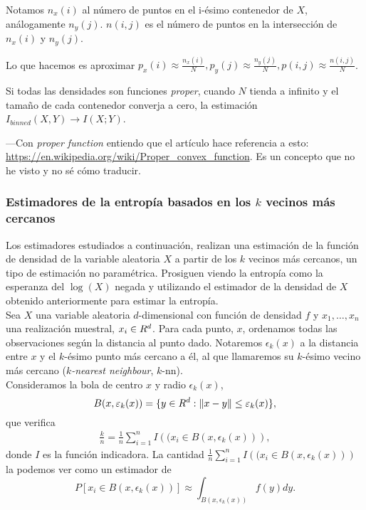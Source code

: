 \documentclass[10pt,a4paper]{article} %
\let\mathbb\relax
\theoremstyle{definition}
\begin{document}
Notamos $n_x(i)$ al número de puntos en el i-ésimo contenedor de $X$, análogamente $n_y(j)$. $n(i,j)$ es el número de puntos en la intersección de $n_x(i)$ y $n_y(j)$.

Lo que hacemos es aproximar $p_x(i) \approx \frac{n_x(i)}{N}, p_y(j) \approx \frac{n_y(j)}{N}, p(i,j) \approx \frac{n(i,j)}{N}$.

Si todas las densidades son funciones \textit{proper}, cuando $N$ tienda a infinito y el tamaño de cada contenedor converja a cero, la estimación $I_{\textit{binned}}(X,Y) \to I(X;Y)$.

---Con \textit{proper function} entiendo que el artículo hace referencia a esto: \url{https://en.wikipedia.org/wiki/Proper\_convex\_function}. Es un concepto que no he visto y no sé cómo traducir.

\subsubsection{Estimadores de la entropía basados en los $k$ vecinos más cercanos}

Los estimadores estudiados a continuación, realizan una estimación de la función de densidad de la variable aleatoria $X$ a partir de los $k$ vecinos más cercanos, un tipo de estimación no paramétrica. Prosiguen viendo la entropía como la esperanza del $\log(X)$ negada y utilizando el estimador de la densidad de $X$ obtenido anteriormente para estimar la entropía.\\

Sea $X$ una variable aleatoria $d$-dimensional con función de densidad $f$ y $x_1,\dots,x_n$ una realización muestral, $x_i\in \mathbb{R}^d$. Para cada punto, $x$, ordenamos todas las observaciones según la distancia al punto dado. Notaremos $\epsilon_k(x)$ a la distancia entre $x$ y el $k$-ésimo punto más cercano a él, al que llamaremos su $k$-ésimo vecino más cercano (\textit{$k$-nearest neighbour}, $k$-nn).\\

Consideramos la bola de centro $x$ y radio $\epsilon_k(x)$,\[
B(x, \epsilon_k(x)) = \{y \in \R^d: \Vert x - y\Vert \leq \epsilon_k(x)\},
\]que verifica \begin{align}\label{eq:knn-ind}
\frac{k}{n} = \frac{1}{n} \sum_{i=1}^nI\left((x_i\in B\left(x,\epsilon_k(x)\right)\right),
\end{align}
donde $I$ es la función indicadora. La cantidad $\frac{1}{n} \sum_{i=1}^nI\left((x_i\in B(x,\epsilon_k(x))\right)$ la podemos ver como un estimador de \[
P[x_i\in B(x,\epsilon_k(x))] \approx \int_{B(x,\epsilon_k(x))}f(y)dy.
\]
\end{document}
